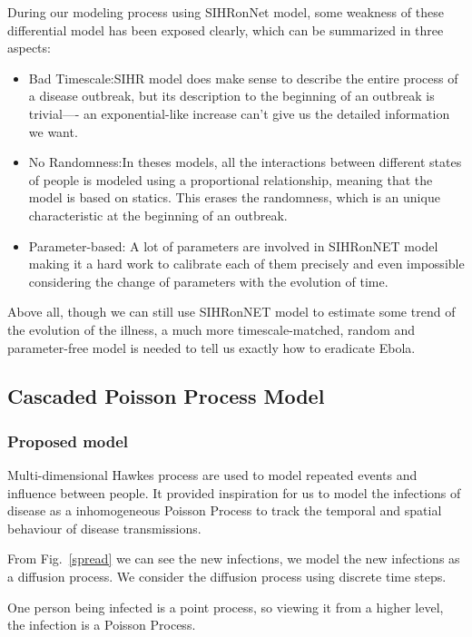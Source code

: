 \documentclass[11pt]{article}
\begin{document}
During our modeling process using SIHRonNet model, some weakness of these differential model has been exposed clearly, which can be summarized in three aspects:
\begin{itemize}

\item	Bad Timescale:SIHR model does make sense to describe the entire process of a disease outbreak, but its description to the beginning of an outbreak is trivial---- an exponential-like increase can’t give us the detailed information we want.  
\item	No Randomness:In theses models, all the interactions between different states of people is modeled using a proportional relationship, meaning that the model is based on statics. This erases the randomness, which is an unique characteristic at the beginning of an outbreak.
\item	Parameter-based: A lot of parameters are involved in SIHRonNET model making it a hard work to calibrate each of them precisely and even impossible considering the change of parameters with the evolution of time.

\end{itemize}

Above all, though we can still use SIHRonNET model to estimate some trend of the evolution of the illness, a much more timescale-matched, random and parameter-free model is needed to tell us exactly how to eradicate Ebola.
 

\subsection{Cascaded Poisson Process Model}
\subsubsection{Proposed model}
Multi-dimensional Hawkes process\cite{zhou2013learning}\cite{iwata2013discovering} are used to model repeated events and influence between people. It provided inspiration for us to model the infections of disease as a inhomogeneous Poisson Process to track the temporal and spatial behaviour of disease transmissions.

From Fig.~\ref{spread} we can see the new infections, we model the new infections as a diffusion process. We consider the diffusion process using discrete time steps.

One person being infected is a point process, so viewing it from a higher level, the infection is a Poisson Process.
\end{document}
